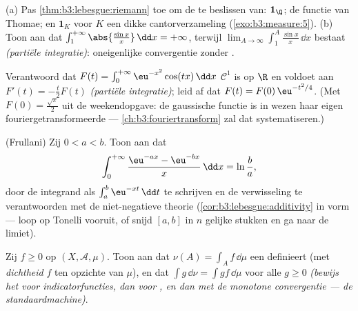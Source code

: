 \begin{exercise}[$\star\star$]\label{exo:b3:lebesgue:6}
(a) Pas \cref{thm:b3:lebesgue:riemann} toe om de
 te beslissen van: $\mathbf 1_\Q$; de
functie van Thomae; en $\mathbf 1_K$ voor $K$ een dikke
cantorverzameling (\cref{exo:b3:measure:5}).
(b) Toon aan dat $\int_1^{+\infty}\abs{\frac{\sin x}x}\,\dd x =
+\infty$, terwijl $\lim_{A\to\infty}\int_1^A\frac{\sin x}x\,\dd x$
bestaat \emph{(partiële integratie)}: oneigenlijke convergentie
zonder .
\end{exercise}

\begin{exercise}[$\star\star$]\label{exo:b3:lebesgue:7}
Verantwoord dat $F(t) = \int_0^{+\infty}\eu^{-x^2}\cos(tx)\,\dd x$
$\mathcal C^1$ is op $\R$ en voldoet aan $F'(t) = -\frac t2F(t)$
\emph{(partiële integratie)}; leid af dat $F(t) =
F(0)\,\eu^{-t^2/4}$. (Met $F(0) = \frac{\sqrt\pi}2$ uit de
weekendopgave: de gaussische functie is in wezen haar eigen
fouriergetransformeerde --- \cref{ch:b3:fouriertransform} zal dat
systematiseren.)
\end{exercise}

\begin{exercise}[$\star\star\star$]\label{exo:b3:lebesgue:8}
(Frullani) Zij $0 < a < b$. Toon aan dat
\[
\int_0^{+\infty}\frac{\eu^{-ax} - \eu^{-bx}}{x}\,\dd x =
\ln\frac ba,
\]
door de integrand als $\int_a^b \eu^{-xt}\,\dd t$ te schrijven en
de verwisseling te verantwoorden met de niet-negatieve theorie
(\cref{cor:b3:lebesgue:additivity} in  vorm --- loop op
Tonelli vooruit, of snijd $[a,b]$ in $n$ gelijke stukken en ga
naar de limiet).
\end{exercise}

\begin{exercise}[$\star\star$]\label{exo:b3:lebesgue:9}
Zij $f \geq 0$  op $(X, \mathcal A, \mu)$. Toon aan dat
$\nu(A) = \int_A f\,\dd\mu$ een  definieert (met
\emph{dichtheid} $f$ ten opzichte
van $\mu$), en dat $\int g\,\dd\nu = \int gf\,\dd\mu$ voor alle
 $g \geq 0$ \emph{(bewijs het voor indicatorfuncties, dan
voor , en dan met de monotone convergentie ---
de standaardmachine)}.
\end{exercise}

